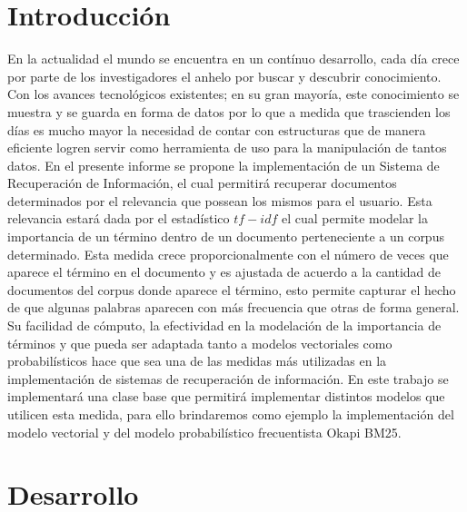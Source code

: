 \documentclass[a4paper,10pt,twocolumn]{article}
\begin{document}
\section{Introducción}\label{sec:intro}
En la actualidad el mundo se encuentra en un contínuo desarrollo, cada día crece por parte 
de los investigadores el anhelo por buscar y descubrir conocimiento. Con los avances tecnológicos existentes; 
en su gran mayoría, este conocimiento se muestra y se guarda en forma de datos por lo que a medida que trascienden 
los días es mucho mayor la necesidad de contar con estructuras que de manera eficiente logren servir como herramienta
de uso para la manipulación de tantos datos. En el presente informe se propone la implementación 
de un Sistema de Recuperación de Información, el cual permitirá recuperar documentos determinados por el relevancia que
possean los mismos para el usuario. Esta relevancia estará dada por el estad\'istico $tf-idf$ el cual permite modelar la 
importancia de un t\'ermino dentro de un documento perteneciente a un corpus determinado. Esta medida crece 
proporcionalmente con el n\'umero de veces que aparece el t\'ermino en el documento y es
ajustada de acuerdo a la cantidad de documentos del corpus donde aparece el t\'ermino, esto
permite capturar el hecho de que algunas palabras aparecen con m\'as frecuencia que otras 
de forma general. Su facilidad de c\'omputo, la efectividad en la modelaci\'on de la importancia de 
t\'erminos y que pueda ser adaptada tanto a modelos vectoriales como probabil\'isticos 
hace que sea una de las medidas m\'as utilizadas en la implementaci\'on de sistemas
de recuperaci\'on de informaci\'on. En este trabajo se implementar\'a una clase base que 
permitir\'a implementar distintos modelos que utilicen esta medida, para ello brindaremos
como ejemplo la implementaci\'on del modelo vectorial y del modelo probabil\'istico frecuentista 
Okapi BM25. 



\section{Desarrollo}\label{sec:dev}
\end{document}
